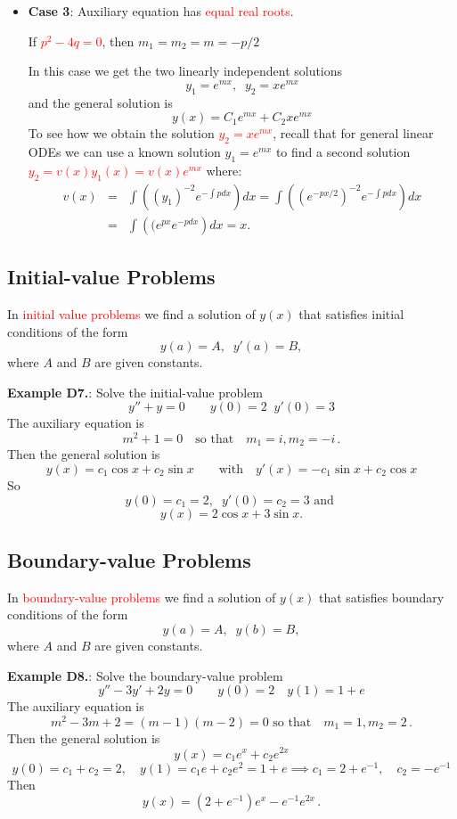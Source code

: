 \documentclass{article}
\begin{document}
\begin{itemize}
\item
\textbf{Case 3}: Auxiliary equation has \textcolor{red}{equal real roots}.

If \textcolor{red}{$p^2- 4q=0$}, then $m_1=m_2=m=-p/2$

In this case we get the two linearly independent solutions
$$
y_1= e^{m x}, \;\; y_2= x e^{m x}
$$
and the general solution is
$$
y(x)= C_1 e^{m x} +C_2 x e^{m x}
$$
To see how we obtain the solution \textcolor{red}{$y_2= x e^{m x}$}, recall that for general linear ODEs we can use a known solution $y_1= e^{m x}$ to find a 
second solution \textcolor{red}{$y_2=v(x) y_1 (x) =v(x) e^{mx}$} where:
{\small
$$
\begin{array}{lll}
 v(x) & = & \int \left( (y_1)^{-2}  e^{- \int p dx} \right) dx=
 \int \left( (e^{-px/2})^{-2}  e^{- \int p dx} \right) dx \\ & = & \int \left( (e^{p x}  e^{-p dx} \right) dx=x.
 \end{array}
$$
}
\end{itemize}


\subsection{Initial-value Problems}

In \textcolor{red}{initial value problems} we find a solution of $y(x)$ that satisfies initial conditions of the form
$$
y(a)=A, \;\; y'(a)=B,
$$
where $A$ and $B$ are given constants.

\textbf{Example D7.}: Solve the initial-value problem
$$
y''+ y=0 \qquad y(0)=2 \;\; y'(0)=3
$$
The auxiliary equation is
$$
m^2+1=0 \quad \mbox{so that} \quad m_1=i, m_2=-i\,.
$$
Then the general solution is
$$
y(x)=c_1 \cos x + c_2 \sin x \qquad \mbox{with} \quad 
y'(x)= -c_1 \sin x + c_2 \cos x
$$
So 
$$
y(0)=c_1=2, \;\;  y'(0)=c_2=3 \mbox{  and  }
$$
$$
y(x)=2 \cos x +3 \sin x.
$$

\subsection{Boundary-value Problems}

In \textcolor{red}{boundary-value problems} we find a solution of $y(x)$ that satisfies boundary conditions of the form
$$
y(a)=A, \;\; y(b)=B,
$$
where $A$ and $B$ are given constants.

\textbf{Example D8.}: Solve the boundary-value problem
$$
y''- 3y' + 2y =0 \qquad y(0)=2 \quad y(1)=1+e
$$
The auxiliary equation is
$$
m^2 - 3 m + 2 = (m-1)(m-2)= 0 \mbox{ so that} \quad m_1= 1, m_2 = 2\,.
$$
Then the general solution is
$$
y(x)=c_1 e^x + c_2 e^{2x}
$$
{\small
$$
y(0) = c_1 + c_2 = 2, \quad y(1) = c_1 e + c_2 e^2  = 1+e \implies c_1 = 2+e^{-1}, \quad c_2=-e^{-1}
$$
}
Then
$$
y(x) = (2 + e^{-1}) e^x - e^{-1} e^{2x}\,.
$$
\end{document}
